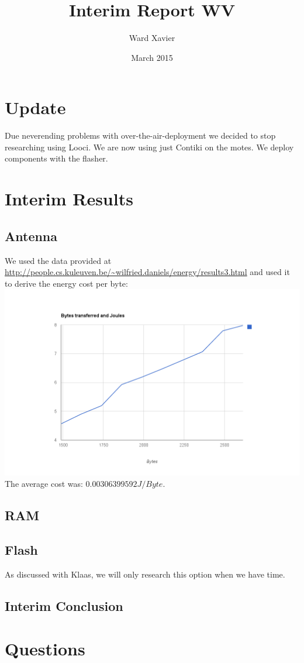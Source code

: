 \documentclass{article}
\title{Interim Report WV}
\author{Ward  Xavier}
\date{March 2015}
\begin{document}
\maketitle

\section{Update}
Due neverending problems with over-the-air-deployment we decided to stop researching using Looci. We are now using just Contiki on the motes. We deploy components with the flasher.
\section{Interim Results}
\subsection{Antenna}
We used the data provided at \url{http://people.cs.kuleuven.be/~wilfried.daniels/energy/results3.html} and used it to derive the energy cost per byte:
\includegraphics[width=\linewidth]{graph.png}
The average cost was: $0.00306399592 J/Byte.$
\subsection{RAM}

\subsection{Flash}
As discussed with Klaas, we will only research this option when we have time.

\subsection{Interim Conclusion}
\section{Questions}
\end{document}
